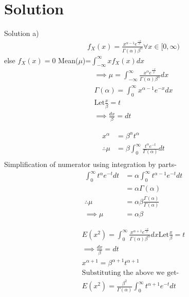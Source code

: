 \documentclass{beamer}
\begin{document}
	\section{Solution}
	\begin{frame}{Solution}
   a) \begin{align}
       f_{X}(x)= \frac{x^{\alpha-1}e^{\frac{-x}{\beta}}}{\Gamma(\alpha) \beta^{\alpha}}  \forall x \in [0,\infty)
    \end{align}
    else $f_{X}(x)=0$
    Mean($\mu$)=$\int_{-\infty}^{\infty}xf_{X}(x)dx$\\
    \begin{align}
    \implies \mu =\int_{-\infty}^{\infty} \frac{x^{\alpha}e^{\frac{-x}{\beta}}}{\Gamma(\alpha) \beta^{\alpha}} dx\\
 \Gamma(\alpha)=\int_{0}^{\infty} x^{\alpha-1}e^{-x} dx\\
 \text{Let} \frac{x}{\beta}=t\\
 \implies \frac{dx}{\beta}=dt
 \end{align}
 \end{frame}
 \begin{frame}
 \begin{align}
 x^{\alpha}&=\beta^{\alpha}t^{\alpha}\\
 \therefore \mu &= \beta \int_{0}^{\infty} \frac{t^{\alpha}e^{-t}}{\Gamma(\alpha)} dt\\
 \end{align}
 Simplification of numerator using integration by parts-\\
 \begin{align}
 	\label{eq:eq4}
 \int_{0}^{\infty} t^{\alpha}e^{-t} dt &= \alpha \int_{0}^{\infty} t^{\alpha-1} e^{-t}dt\\
& =\alpha \Gamma(\alpha)\\
 \therefore \mu &=\alpha \beta \frac{\Gamma(\alpha)}{\Gamma(\alpha)}\\
 \implies \mu&=\alpha\beta
    \end{align}
\end{frame}
\begin{frame}
 \begin{align}
 E(x^2)=\int_{0}^{\infty}\frac{x^{\alpha+1}e^{\frac{-x}{\beta}}}{\Gamma(\alpha) \beta^{\alpha}} dx
 \text{Let} \frac{x}{\beta}=t\\
 \implies \frac{dx}{\beta}=dt\\
 x^{\alpha+1}=\beta^{\alpha+1}t^{\alpha+1}\\
 \text{Substituting the above we get-}\\
 E(x^2)=\frac{\beta^{2}}{\Gamma(\alpha)}\int_{0}^{\infty}t^{\alpha+1}e^{-t} dt
 \end{align}
 \end{frame}
\end{document}
